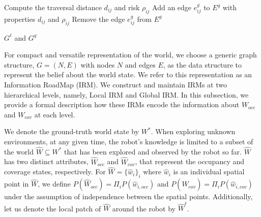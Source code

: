\documentclass[letterpaper]{article} %
\newcommand{\phdone}[1]{} %
\begin{document}
\begin{algorithm}[t!]
{\begin{algorithmic}
      \STATE Compute the traversal distance $d_{ij}$ and risk $\rho_{ij}$
        \STATE Add an edge $e^g_{ij}$ to $E^g$ with properties $d_{ij}$ and $\rho_{ij}$
      \ELSE
        \STATE Remove the edge $e^g_{ij}$ from $E^g$
      \ENDIF
    \ENDFOR
  \ENDFOR



  \vspace{3pt}
  \RETURN $G^\ell$ and $G^g$

\end{algorithmic}
} %
\end{algorithm}



\phdone{Data structure}
For compact and versatile representation of the world, we choose a generic graph structure, $G = (N, E)$ with nodes $N$ and edges $E$, as the data structure to represent the belief about the world state.
We refer to this representation as an Information RoadMap (IRM).
We construct and maintain IRMs at two hierarchical levels, namely, Local IRM and Global IRM.
In this subsection, we provide a formal description how these IRMs encode the information about $W_{occ}$ and $W_{cov}$ at each level.


\phdone{Formulation}
We denote the ground-truth world state by $W^*$. When exploring unknown environments, at any given time, the robot's knowledge is limited to a subset of the  world $\hat{W}\!\!\subseteq\! W^*$ that has been explored and observed by the robot so far.
$\hat{W}$ has two distinct attributes, $\hat{W}_{occ}$ and $\hat{W}_{cov}$, that represent the occupancy and coverage states, respectively.
%
For $\hat{W} = \{\hat{w}_i\}_i$ where $\hat{w}_i$ is an individual spatial point in $\hat{W}$, we define $P(\hat{W}_{occ}) = \Pi_i P(\hat{w}_{i,occ})$ and $P(\hat{W}_{cov}) = \Pi_i P(\hat{w}_{i,cov})$ under the assumption of independence between the spatial points.
Additionally, let us denote the local patch of $\hat{W}$ around the robot by $\hat{W}^\ell$.
%
%
\end{document}
